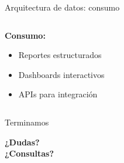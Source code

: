 \documentclass{beamer}
\begin{document}
\begin{frame}{Arquitectura de datos: consumo}
    \begin{columns}
        \begin{column}{0.6\textwidth}
            \textbf{Consumo:}
            \begin{itemize}
                \item Reportes estructurados
                \item Dashboards interactivos
                \item APIs para integración
            \end{itemize}
        \end{column}
        \begin{column}{0.4\textwidth}
            \centering
            {\fontsize{60}{60}\selectfont \faDesktop}
        \end{column}
    \end{columns}
\end{frame}

\begin{frame}{Terminamos}
    \begin{center}
        \Large{\textbf{¿Dudas?\\¿Consultas?}}
    \end{center}
\end{frame}
\end{document}
